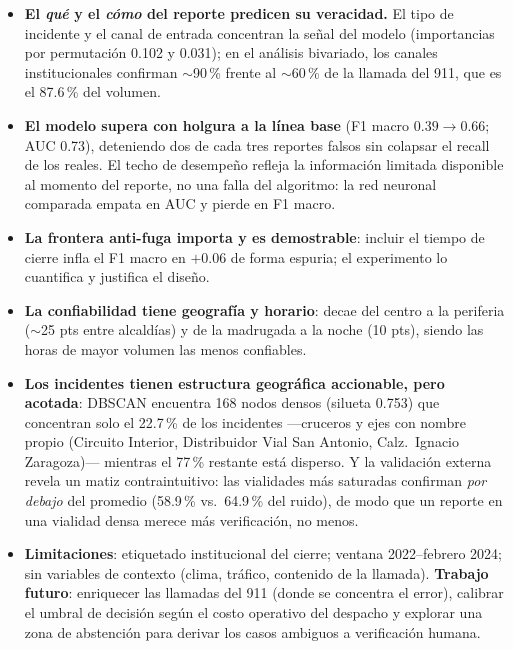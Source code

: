 \documentclass[11pt,letterpaper]{article}
\begin{document}
\begin{itemize}[nosep]
  \item \textbf{El \emph{qué} y el \emph{cómo} del reporte predicen su
        veracidad.} El tipo de incidente y el canal de entrada concentran la
        señal del modelo (importancias por permutación 0.102 y 0.031); en el
        análisis bivariado, los canales institucionales confirman $\sim$90\,\%
        frente al $\sim$60\,\% de la llamada del 911, que es el 87.6\,\% del
        volumen.
  \item \textbf{El modelo supera con holgura a la línea base} (F1 macro
        $0.39 \rightarrow 0.66$; AUC 0.73), deteniendo dos de cada tres
        reportes falsos sin colapsar el recall de los reales. El techo de
        desempeño refleja la información limitada disponible al momento del
        reporte, no una falla del algoritmo: la red neuronal comparada empata
        en AUC y pierde en F1 macro.
  \item \textbf{La frontera anti-fuga importa y es demostrable}: incluir el
        tiempo de cierre infla el F1 macro en $+0.06$ de forma espuria; el
        experimento lo cuantifica y justifica el diseño.
  \item \textbf{La confiabilidad tiene geografía y horario}: decae del centro
        a la periferia ($\sim$25 pts entre alcaldías) y de la madrugada a la
        noche (10 pts), siendo las horas de mayor volumen las menos
        confiables.
  \item \textbf{Los incidentes tienen estructura geográfica accionable, pero
        acotada}: DBSCAN encuentra 168 nodos densos (silueta 0.753) que
        concentran solo el 22.7\,\% de los incidentes —cruceros y ejes con
        nombre propio (Circuito Interior, Distribuidor Vial San Antonio,
        Calz.\ Ignacio Zaragoza)— mientras el 77\,\% restante está disperso.
        Y la validación externa revela un matiz contraintuitivo: las
        vialidades más saturadas confirman \emph{por debajo} del promedio
        (58.9\,\% vs.\ 64.9\,\% del ruido), de modo que un reporte en una
        vialidad densa merece más verificación, no menos.
  \item \textbf{Limitaciones}: etiquetado institucional del cierre; ventana
        2022--febrero 2024; sin variables de contexto (clima, tráfico,
        contenido de la llamada). \textbf{Trabajo futuro}: enriquecer las
        llamadas del 911 (donde se concentra el error), calibrar el umbral de
        decisión según el costo operativo del despacho y explorar una zona de
        abstención para derivar los casos ambiguos a verificación humana.
\end{itemize}
\end{document}
